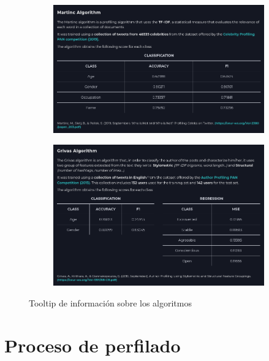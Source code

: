 \bigskip
\begin{figure}[H]
	\centering
	\begin{subfigure}[c]{0.51\textwidth}
			\centering
			\includegraphics[width=\textwidth]{imagenes/tooltip-martinc.png}
			\label{fig:casouso_tooltip_martinc}
	\end{subfigure}
	\hfill
	\begin{subfigure}[c]{0.46\textwidth}
			\centering
			\includegraphics[width=\textwidth]{imagenes/tooltip-grivas.png}
			\label{fig:casouso_tooltip_grivas}
	\end{subfigure}
	\vspace{-1\baselineskip}
	\caption{Tooltip de información sobre los algoritmos}
	\label{fig:casouso_tooltip}
\end{figure}

\section{Proceso de perfilado}
\label{sec:casouso_perfilado}

